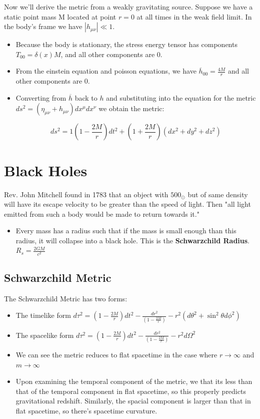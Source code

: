 \documentclass[11pt]{article}
\begin{document}
\noindent Now we'll derive the metric from a weakly gravitating source. Suppose we have a static point mass M located at point \( r = 0 \) at all times in the weak field limit.
In the body's frame we have \( |h_{\mu\nu}| \ll 1 \). 
\begin{itemize}
    \item Because the body is stationary, the stress energy tensor has components \( T_{00} = \delta(x)M \), and all other 
    components are 0. 
    \item From the einstein equation and poisson equations, we have \(  \overline{h}_{00} = \frac{4M}{r}\) and all other components are 0. 
    \item Converting from \( \overline{h} \) back to \( h \) and substituting into the equation for the metric \( ds^{2} = (\eta_{\mu\nu} + h_{\mu\nu})dx^{\mu}dx^{\nu} \) we 
    obtain the metric:
    
    \[ 
        ds^{2} = 1 \left( 1 - \frac{2M}{r}\right)dt^{2} +\left(1+\frac{2M}{r}\right)(dx^{2} + dy^{2} + dz^{2})
    \]

    

\end{itemize}





\section{Black Holes}
Rev. John Mitchell found in 1783 that an object with $500_{\odot}$ but of same density will have its escape velocity to be greater than the speed of light. Then 
"all light emitted from such a body would be made to return towards it."
\begin{itemize}
    \item Every mass has a radius such that if the mass is small enough than this radius, it will collapse into a black hole. This is the \textbf{Schwarzchild Radius}. 
    $R_{s} = \frac{2 G M}{c^2}$

\end{itemize}


\subsection{Schwarzchild Metric}
The Schwarzchild Metric has two forms:
\begin{itemize}
    \item The timelike form $d\tau^{2} = (1 - \frac{2M}{r})dt^2 - \frac{dr^2}{(1 - \frac{2M}{r})} - r^2(d\theta^2 + \sin^2\theta d\phi^2)$
    \item The spacelike form $d\tau^{2} = (1 - \frac{2M}{r})dt^2 - \frac{dr^2}{(1 - \frac{2M}{r})} - r^2d\Omega^2$
    \item We can see the metric reduces to flat spacetime in the case where $r \rightarrow \infty$ and $m \rightarrow \infty$
    \item Upon examining the temporal component of the metric, we that its less than that of the temporal component in flat spacetime, so this properly predicts gravitational
    redshift. Similarly, the spacial component is larger than that in flat spacetime, so there's spacetime curvature.
\end{itemize}
\end{document}
